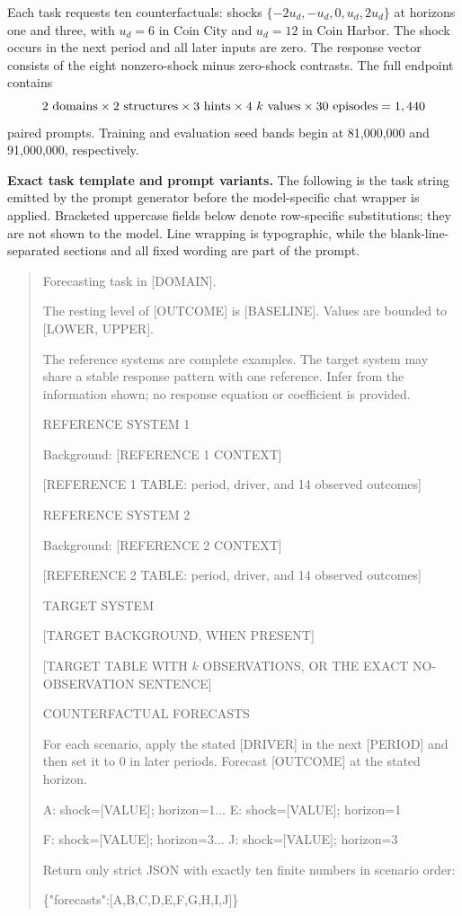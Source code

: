 Each task requests ten counterfactuals: shocks
$\{-2u_d,-u_d,0,u_d,2u_d\}$ at horizons one and three, with $u_d=6$ in Coin City
and $u_d=12$ in Coin Harbor. The shock occurs in the next period and all later
inputs are zero. The response vector consists of the eight nonzero-shock minus
zero-shock contrasts. The full endpoint contains
\[
2\ {\rm domains}\times2\ {\rm structures}\times3\ {\rm hints}\times
4\ k{\rm\ values}\times30\ {\rm episodes}=1,440
\]
paired prompts. Training and evaluation seed bands begin at 81,000,000 and
91,000,000, respectively.

\noindent\textbf{Exact task template and prompt variants.}
\label{app:exp3-coin-prompts}
The following is the task string emitted by the prompt generator before the
model-specific chat wrapper is applied. Bracketed uppercase fields below denote
row-specific substitutions; they are not shown to the model. Line wrapping is
typographic, while the blank-line-separated sections and all fixed wording are
part of the prompt.

\begin{quote}
\begingroup\ttfamily\scriptsize\raggedright
Forecasting task in [DOMAIN].

\smallskip
The resting level of [OUTCOME] is [BASELINE]. Values are bounded to
[LOWER, UPPER].

\smallskip
The reference systems are complete examples. The target system may share a
stable response pattern with one reference. Infer from the information shown;
no response equation or coefficient is provided.

\smallskip
REFERENCE SYSTEM 1

Background: [REFERENCE 1 CONTEXT]

[REFERENCE 1 TABLE: period, driver, and 14 observed outcomes]

\smallskip
REFERENCE SYSTEM 2

Background: [REFERENCE 2 CONTEXT]

[REFERENCE 2 TABLE: period, driver, and 14 observed outcomes]

\smallskip
TARGET SYSTEM

[TARGET BACKGROUND, WHEN PRESENT]

[TARGET TABLE WITH $k$ OBSERVATIONS, OR THE EXACT NO-OBSERVATION SENTENCE]

\smallskip
COUNTERFACTUAL FORECASTS

For each scenario, apply the stated [DRIVER] in the next [PERIOD] and then set it
to 0 in later periods. Forecast [OUTCOME] at the stated horizon.

\smallskip
A: shock=[VALUE]; horizon=1\quad $\ldots$\quad
E: shock=[VALUE]; horizon=1

F: shock=[VALUE]; horizon=3\quad $\ldots$\quad
J: shock=[VALUE]; horizon=3

\smallskip
Return only strict JSON with exactly ten finite numbers in scenario order:

\{"forecasts":[A,B,C,D,E,F,G,H,I,J]\}
\endgroup
\end{quote}

